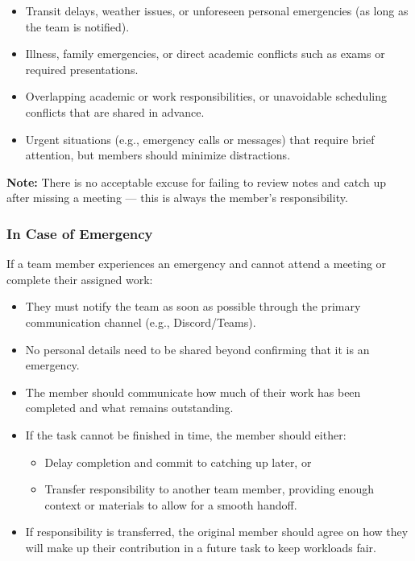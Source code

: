 \documentclass{article}
\begin{document}
\begin{itemize}
    \item Transit delays, weather issues, or unforeseen personal emergencies (as long as the team is notified).
    \item Illness, family emergencies, or direct academic conflicts such as exams or required presentations.
    \item Overlapping academic or work responsibilities, or unavoidable scheduling conflicts that are shared in advance.
    \item Urgent situations (e.g., emergency calls or messages) that require brief attention, but members should minimize distractions.
\end{itemize}

\textbf{Note:} There is no acceptable excuse for failing to review notes and catch up after missing a meeting — this is always the member’s responsibility.

\subsubsection*{In Case of Emergency}

If a team member experiences an emergency and cannot attend a meeting or complete their assigned work:
\begin{itemize}
    \item They must notify the team as soon as possible through the primary communication channel (e.g., Discord/Teams).
    \item No personal details need to be shared beyond confirming that it is an emergency.
    \item The member should communicate how much of their work has been completed and what remains outstanding.
    \item If the task cannot be finished in time, the member should either:
    \begin{itemize}
        \item Delay completion and commit to catching up later, or
        \item Transfer responsibility to another team member, providing enough context or materials to allow for a smooth handoff.
    \end{itemize}
    \item If responsibility is transferred, the original member should agree on how they will make up their contribution in a future task to keep workloads fair.
\end{itemize}
\end{document}
